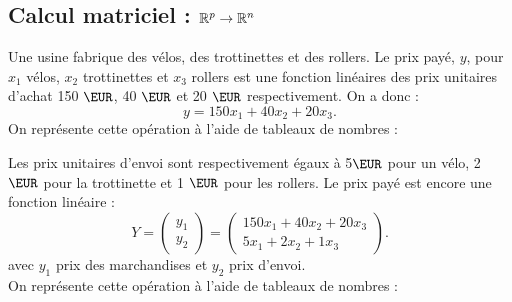 \documentclass{book}
\begin{document}
\subsection{Calcul matriciel : $\R ^p\rightarrow\R ^n$}
\begin{Exemple}
Une usine fabrique des vélos, des trottinettes et des rollers. Le prix payé, $y$,   pour $x_1$ vélos, $x_2$ trottinettes et $x_3$ rollers est une fonction linéaires des prix unitaires d'achat 150 $\EUR$, 40 $\EUR$ et 20 $\EUR$ respectivement. On a donc :
$$y=150x_1+40x_2+20x_3.$$
On représente cette opération à l'aide de tableaux de nombres :

\begin{center}
\end{center}
Les prix unitaires d'envoi sont respectivement égaux à 5$\EUR$ pour un vélo, 2 $\EUR$ pour la trottinette et 1 $\EUR$ pour les rollers.   Le prix payé est encore une fonction linéaire :
$$Y=\begin{pmatrix}y_1\\y_2\end{pmatrix}=\begin{pmatrix} 150x_1+40x_2+20x_3 \\5x_1+2x_2+1x_3  \end{pmatrix}.$$
avec $y_1$ prix des marchandises et $y_2$ prix d'envoi.\\
On représente cette opération à l'aide de tableaux de nombres :
\begin{center}
\begin{tikzpicture}[>=latex]



\end{tikzpicture}
\end{center}
\end{Exemple}
\end{document}
